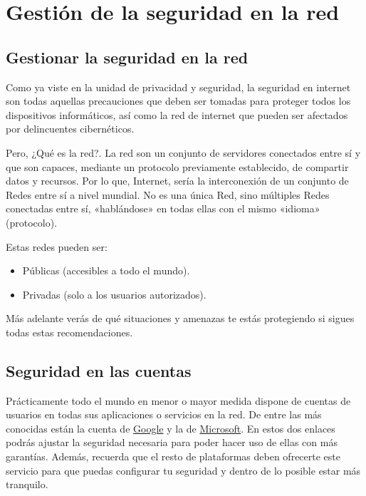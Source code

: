 \documentclass[
  spanish,
  a4paper,
  openany]{book}
\providecommand{\tightlist}{%
  \setlength{\itemsep}{0pt}\setlength{\parskip}{0pt}}
\begin{document}
\hypertarget{gestiuxf3n-de-la-seguridad-en-la-red}{%
\chapter{Gestión de la seguridad en la red}\label{gestiuxf3n-de-la-seguridad-en-la-red}}

\hypertarget{gestionar-la-seguridad-en-la-red}{%
\section{Gestionar la seguridad en la red}\label{gestionar-la-seguridad-en-la-red}}

Como ya viste en la unidad de privacidad y seguridad, la seguridad en internet son todas aquellas precauciones que deben ser tomadas para proteger todos los dispositivos informáticos, así como la red de internet que pueden ser afectados por delincuentes cibernéticos.

Pero, ¿Qué es la red?. La red son un conjunto de servidores conectados entre sí y que son capaces, mediante un protocolo previamente establecido, de compartir datos y recursos. Por lo que, Internet, sería la interconexión de un conjunto de Redes entre sí a nivel mundial. No es una única Red, sino múltiples Redes conectadas entre sí, «hablándose» en todas ellas con el mismo «idioma» (protocolo).

Estas redes pueden ser:

\begin{itemize}
\tightlist
\item
  Públicas (accesibles a todo el mundo).
\item
  Privadas (solo a los usuarios autorizados).
\end{itemize}

Más adelante verás de qué situaciones y amenazas te estás protegiendo si sigues todas estas recomendaciones.

\hypertarget{seguridad-en-las-cuentas}{%
\section{Seguridad en las cuentas}\label{seguridad-en-las-cuentas}}

Prácticamente todo el mundo en menor o mayor medida dispone de cuentas de usuarios en todas sus aplicaciones o servicios en la red. De entre las más conocidas están la cuenta de \href{https://myaccount.google.com/security}{Google} y la de \href{https://account.microsoft.com/security}{Microsoft}. En estos dos enlaces podrás ajustar la seguridad necesaria para poder hacer uso de ellas con más garantías. Además, recuerda que el resto de plataformas deben ofrecerte este servicio para que puedas configurar tu seguridad y dentro de lo posible estar más tranquilo.
\end{document}
